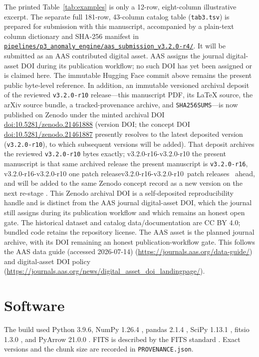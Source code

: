 \documentclass[twocolumn,linenumbers]{aastex702}
\makeatletter
\newcommand{\paperVersion}{v3.2.0-r16}
\newcommand{\depositVersion}{v3.2.0-r10}
\def\bb@afterR#1-r#2\@nil{#2}                 %
\newcommand{\patchOf}[1]{\expandafter\bb@afterR#1\@nil}
\newcommand{\bb@patchDelta}{\numexpr\patchOf{\paperVersion}-\patchOf{\depositVersion}\relax}
\newcommand{\depositRelation}{%
  \ifnum\bb@patchDelta=0
    the present manuscript is that same archived release%
  \else
    the present manuscript is \texttt{\paperVersion}, %
    \ifnum\bb@patchDelta=1 one patch release\else\the\bb@patchDelta\ patch releases\fi\ %
    ahead, and will be added to the same Zenodo concept record as a new version
    on the next re-stage%
  \fi}
\makeatother
\begin{document}
The printed Table~\ref{tab:examples} is only a 12-row, eight-column illustrative excerpt.  The
separate full 181-row, 43-column catalog table (\texttt{tab3.tsv}) is prepared for submission with
this manuscript, accompanied by a plain-text column dictionary and SHA-256
manifest in
\href{https://github.com/Hubify-Projects/bigbounce/tree/main/pipelines/p3_anomaly_engine/aas_submission_v3.2.0-r4}{\nolinkurl{pipelines/p3_anomaly_engine/aas_submission_v3.2.0-r4/}}.  It will be submitted as an
AAS contributed digital asset.  AAS assigns the journal digital-asset DOI during its publication
workflow; no such DOI has yet been assigned or is claimed here.  The immutable Hugging Face commit
above remains the present public byte-level reference.  In addition, an immutable versioned
archival deposit of the reviewed \texttt{\depositVersion} release---this manuscript PDF, its \LaTeX{}
source, the arXiv source bundle, a tracked-provenance archive, and \texttt{SHA256SUMS}---is now
published on Zenodo under the minted archival DOI
\href{https://doi.org/10.5281/zenodo.21461888}{doi:10.5281/zenodo.21461888} (version DOI; the
concept DOI \href{https://doi.org/10.5281/zenodo.21461887}{doi:10.5281/zenodo.21461887}
presently resolves to the latest deposited version (\texttt{\depositVersion}), to which subsequent
versions will be added).  That deposit archives the reviewed \texttt{\depositVersion} bytes exactly;
\depositRelation.  This Zenodo archival DOI is a self-deposited
reproducibility handle and is distinct from the AAS journal digital-asset DOI, which the journal
still assigns during its publication workflow and which remains an honest open gate.  The historical dataset and catalog
data/documentation are CC BY 4.0; bundled code retains the repository license.  The AAS asset is
the planned journal archive, with its DOI remaining an honest publication-workflow gate.  This follows the AAS data guide (accessed 2026-07-14)
(\url{https://journals.aas.org/data-guide/}) and digital-asset DOI policy
(\url{https://journals.aas.org/news/digital_asset_doi_landingpage/}).

\section*{Software}

The build used Python 3.9.6, NumPy 1.26.4 \citep{Harris2020}, pandas 2.1.4
\citep{McKinney2010}, SciPy 1.13.1 \citep{Virtanen2020}, fitsio 1.3.0
\citep{SheldonFitsio}, and PyArrow 21.0.0 \citep{ApacheArrow}.  FITS is described by
the FITS standard \citep{Pence2010}.  Exact versions and the chunk size are recorded in
\texttt{PROVENANCE.json}.
\end{document}
